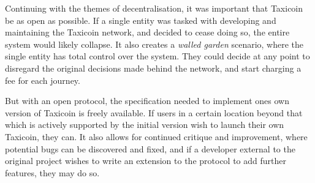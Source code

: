 Continuing with the themes of decentralisation, it was important that Taxicoin be as open as possible. If a single entity was tasked with developing and maintaining the Taxicoin network, and decided to cease doing so, the entire system would likely collapse. It also creates a \textit{walled garden} scenario, where the single entity has total control over the system. They could decide at any point to disregard the original decisions made behind the network, and start charging a fee for each journey.

But with an open protocol, the specification needed to implement ones own version of Taxicoin is freely available. If users in a certain location beyond that which is actively supported by the initial version wish to launch their own Taxicoin, they can. It also allows for continued critique and improvement, where potential bugs can be discovered and fixed, and if a developer external to the original project wishes to write an extension to the protocol to add further features, they may do so.
